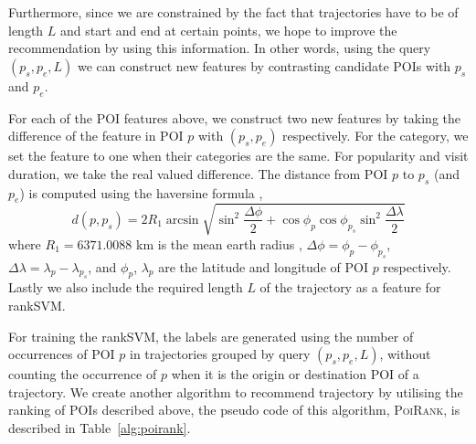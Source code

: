 Furthermore, since we are constrained by the fact that trajectories have to be of length $L$ and start and end at certain points, we hope to improve the recommendation by using this information.
In other words, using the query $(p_s, p_e, L)$ we can construct new features by contrasting
candidate POIs with $p_s$ and $p_e$.

For each of the POI features above, we construct two new features by taking the difference of
the feature in POI $p$ with $(p_s, p_e)$ respectively.
For the category, we set the feature to one when their categories are the same.
For popularity and visit duration, we take the real valued difference.
The distance from POI $p$ to $p_s$ (and $p_e$) is computed using the haversine formula \cite{haversine},
\begin{displaymath}
  d(p, p_s) = 2 R_1 \arcsin \sqrt{ \sin^2 \frac{\Delta \phi}{2} +
    \cos \phi_p \cos \phi_{p_s} \sin^2 \frac{\Delta \lambda}{2} }
\end{displaymath}
where $R_1 = 6371.0088$ km is the mean earth radius \cite{earth_radius},
$\Delta \phi = \phi_p - \phi_{p_s}$, $\Delta \lambda = \lambda_p - \lambda_{p_s}$,
and $\phi_p$, $\lambda_p$ are the latitude and longitude of POI $p$ respectively.
Lastly we also include the required length $L$ of the trajectory as a feature for rankSVM.

For training the rankSVM, the labels are generated using the number of occurrences of
POI $p$ in trajectories grouped by query $(p_s, p_e, L)$,
without counting the occurrence of $p$ when it is the origin or destination POI of a trajectory.
We create another algorithm to recommend trajectory by utilising
the ranking of POIs described above,
the pseudo code of this algorithm, \textsc{PoiRank}, is described in Table~\ref{alg:poirank}.


